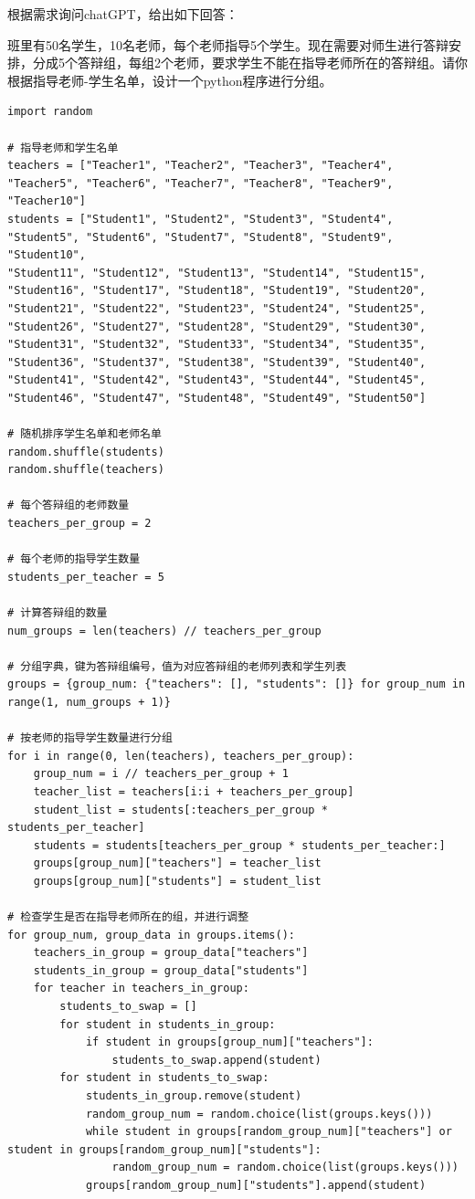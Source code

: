 \documentclass[10pt]{elegantnote}
\begin{document}
\begin{sloppypar}
根据需求询问chatGPT，给出如下回答：

\begin{framed}
    班里有50名学生，10名老师，每个老师指导5个学生。现在需要对师生进行答辩安排，分成5个答辩组，每组2个老师，要求学生不能在指导老师所在的答辩组。请你根据指导老师-学生名单，设计一个python程序进行分组。
\end{framed}

\begin{lstlisting}
import random

# 指导老师和学生名单
teachers = ["Teacher1", "Teacher2", "Teacher3", "Teacher4", "Teacher5", "Teacher6", "Teacher7", "Teacher8", "Teacher9", "Teacher10"]
students = ["Student1", "Student2", "Student3", "Student4", "Student5", "Student6", "Student7", "Student8", "Student9", "Student10",
"Student11", "Student12", "Student13", "Student14", "Student15", "Student16", "Student17", "Student18", "Student19", "Student20",
"Student21", "Student22", "Student23", "Student24", "Student25", "Student26", "Student27", "Student28", "Student29", "Student30",
"Student31", "Student32", "Student33", "Student34", "Student35", "Student36", "Student37", "Student38", "Student39", "Student40",
"Student41", "Student42", "Student43", "Student44", "Student45", "Student46", "Student47", "Student48", "Student49", "Student50"]

# 随机排序学生名单和老师名单
random.shuffle(students)
random.shuffle(teachers)

# 每个答辩组的老师数量
teachers_per_group = 2

# 每个老师的指导学生数量
students_per_teacher = 5

# 计算答辩组的数量
num_groups = len(teachers) // teachers_per_group

# 分组字典，键为答辩组编号，值为对应答辩组的老师列表和学生列表
groups = {group_num: {"teachers": [], "students": []} for group_num in range(1, num_groups + 1)}

# 按老师的指导学生数量进行分组
for i in range(0, len(teachers), teachers_per_group):
    group_num = i // teachers_per_group + 1
    teacher_list = teachers[i:i + teachers_per_group]
    student_list = students[:teachers_per_group * students_per_teacher]
    students = students[teachers_per_group * students_per_teacher:]
    groups[group_num]["teachers"] = teacher_list
    groups[group_num]["students"] = student_list

# 检查学生是否在指导老师所在的组，并进行调整
for group_num, group_data in groups.items():
    teachers_in_group = group_data["teachers"]
    students_in_group = group_data["students"]
    for teacher in teachers_in_group:
        students_to_swap = []
        for student in students_in_group:
            if student in groups[group_num]["teachers"]:
                students_to_swap.append(student)
        for student in students_to_swap:
            students_in_group.remove(student)
            random_group_num = random.choice(list(groups.keys()))
            while student in groups[random_group_num]["teachers"] or student in groups[random_group_num]["students"]:
                random_group_num = random.choice(list(groups.keys()))
            groups[random_group_num]["students"].append(student)


\end{lstlisting}
\end{sloppypar}
\end{document}
